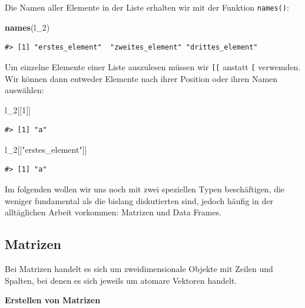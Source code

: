 \documentclass[]{book}
\newenvironment{Shaded}{\begin{snugshade}}{\end{snugshade}}
\newcommand{\KeywordTok}[1]{\textcolor[rgb]{0.13,0.29,0.53}{\textbf{#1}}}
\newcommand{\DecValTok}[1]{\textcolor[rgb]{0.00,0.00,0.81}{#1}}
\newcommand{\StringTok}[1]{\textcolor[rgb]{0.31,0.60,0.02}{#1}}
\newcommand{\NormalTok}[1]{#1}
\begin{document}
Die Namen aller Elemente in der Liste erhalten wir mit der Funktion
\texttt{names()}:

\begin{Shaded}
\begin{Highlighting}[]
\KeywordTok{names}\NormalTok{(l_}\DecValTok{2}\NormalTok{)}
\end{Highlighting}
\end{Shaded}

\begin{verbatim}
#> [1] "erstes_element"  "zweites_element" "drittes_element"
\end{verbatim}

Um einzelne Elemente einer Liste auszulesen müssen wir \texttt{{[}{[}}
anstatt \texttt{{[}} verwemden. Wir können dann entweder Elemente nach
ihrer Position oder ihren Namen auswählen:

\begin{Shaded}
\begin{Highlighting}[]
\NormalTok{l_}\DecValTok{2}\NormalTok{[[}\DecValTok{1}\NormalTok{]]}
\end{Highlighting}
\end{Shaded}

\begin{verbatim}
#> [1] "a"
\end{verbatim}

\begin{Shaded}
\begin{Highlighting}[]
\NormalTok{l_}\DecValTok{2}\NormalTok{[[}\StringTok{"erstes_element"}\NormalTok{]]}
\end{Highlighting}
\end{Shaded}

\begin{verbatim}
#> [1] "a"
\end{verbatim}

Im folgenden wollen wir uns noch mit zwei speziellen Typen beschäftigen,
die weniger fundamental als die bislang diskutierten sind, jedoch häufig
in der alltäglichen Arbeit vorkommen: Matrizen und Data Frames.

\subsection{Matrizen}\label{matrizen}

Bei Matrizen handelt es sich um zweidimensionale Objekte mit Zeilen und
Spalten, bei denen es sich jeweils um atomare Vektoren handelt.

\textbf{Erstellen von Matrizen}
\end{document}
